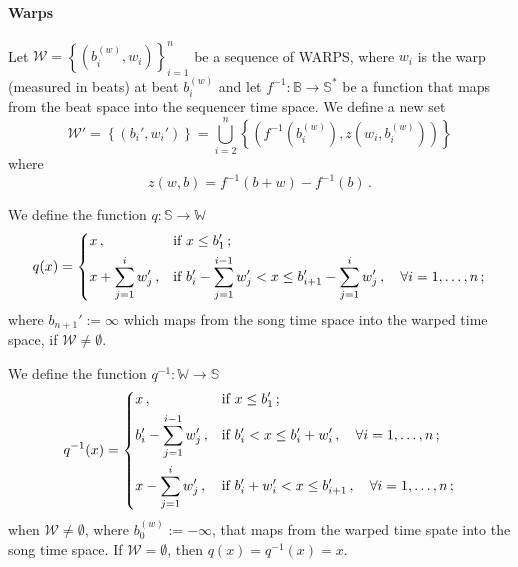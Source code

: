 \documentclass[a4paper,9pt]{article}
\begin{document}
\paragraph{Warps}
Let $ \mathcal{W} =  \left\{\left( b_i^{(w)}, w_i \right)\right\}_{i=1}^{n} $ be a sequence of WARPS, where $ w_i $ is the warp (measured in beats) at beat $ b_i^{(w)} $ and let $ f^{-1}: \mathbb{B}\rightarrow \mathbb{S^{*}} $  be a function that maps from the beat space into the sequencer time space. We define a new set
\begin{equation}
	\mathcal{W'} = \left\{\left( b_i', w_i' \right)\right\} =\bigcup_{i=2}^{n}  \left\{\left( f^{-1} \left( b_i^{(w)} \right),z \left( w_i, b_i^{(w)} \right) \right)\right\}
\end{equation}
where 
\begin{equation}
	z(w,b) = f^{-1}(b+w) - f^{-1}(b) \,.
\end{equation}

We define the function $ q: \mathbb{S}\rightarrow \mathbb{W} $
\begin{equation}
	q(x) = \begin{dcases}
		x\,, & \text{if $ x \leq b_1' $}\,;\\
		x+ \sum_{j=1}^{i}w_j'\,, & \text{if $ b_i' - \sum_{j=1}^{i-1}w_j' < x \leq b_{i+1}' - \sum_{j=1}^{i}w_j'\,,\quad \forall i=1,\dots,n$}\,;\\
	\end{dcases}
	\label{eq:q-1}
\end{equation}
where $ b_{n+1}' := \infty $ which maps from the song time space into the warped time space, if $ \mathcal{W} \neq \emptyset $.

We define the function $ q^{-1}: \mathbb{W}\rightarrow \mathbb{S} $
\begin{equation}
	q^{-1}(x) = \begin{dcases}
		x\,, & \text{if $ x \leq b_1' $}\,;\\
		b_i'- \sum_{j=1}^{i-1}w_j'\,, & \text{if $ b_i' < x \leq b_i'+ w_i'\,,\quad \forall i=1,\dots,n$}\,;\\
		x - \sum_{j=1}^{i}w_j'\,, & \text{if $ b_i' + w_i' < x \leq b_{i+1}'\,,\quad \forall i=1,\dots,n$}\,;\\
	\end{dcases}
	\label{eq:q}
\end{equation}
when $ \mathcal{W} \neq \emptyset $, where $ b^{(w)}_0 := -\infty $, that maps from the warped time spate into the song time space.
If $ \mathcal{W} = \emptyset $, then $ q(x) = q^{-1}(x) = x$. 
\end{document}
